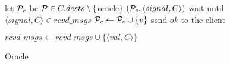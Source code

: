 \begin{algorithm}[t!]
\begin{distribalgo}[1]
		\STATE let $\mathcal{P}_c$ be $\mathcal{P} \in C.dests \setminus \{$oracle$\}$
		\STATE \rmcast$(\mathcal{P}_c, \langle signal, C \rangle )$
		\STATE wait until $\langle signal, C \rangle \in rcvd\_msgs$
		\STATE $\mathcal{P}_c \leftarrow \mathcal{P}_c \cup      \{v\}$
                \STATE send $ok$ to the client
	\ENDINDENT
       
%        
    \vspace{1.0mm}
        \STATE $rcvd\_msgs \leftarrow rcvd\_msgs \cup \{\langle val, C \rangle\}$
    \ENDINDENT


\caption{Oracle}
\label{alg:oracle_proxy}
\end{distribalgo}
\end{algorithm}